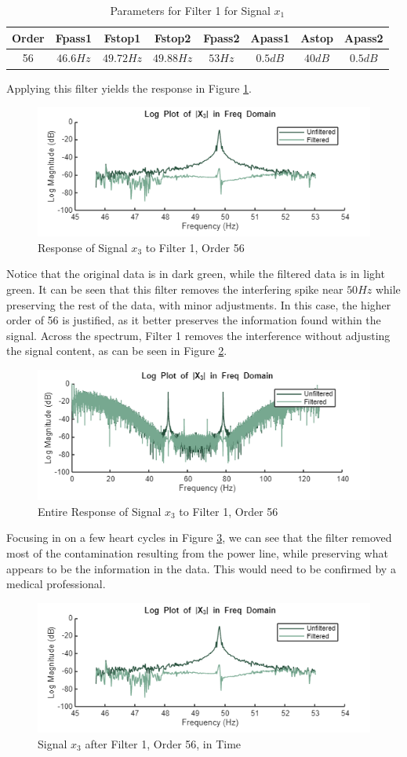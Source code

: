 \begin{table}[H]
    \centering
    \begin{tabular}{c|ccccccc}
         Order & Fpass1 & Fstop1 & Fstop2 & Fpass2 & Apass1 & Astop & Apass2 \\ \hline
         56 & $46.6 \unit{Hz}$ & $49.72  \unit{Hz}$ & $49.88  \unit{Hz}$ & $53  \unit{Hz}$ & $0.5  \unit{dB}$ & $40  \unit{dB}$ & $0.5  \unit{dB}$
    \end{tabular}
    \caption{Parameters for Filter 1 for Signal $x_1$}
    \label{tab:x3_v11}
\end{table}

Applying this filter yields the response in Figure \ref{fig:x3_v11}.
\begin{figure}[H]
    \centering
    \includegraphics[width=0.5\linewidth]{figures/X3_v11.png}
    \caption{Response of Signal $x_3$ to Filter 1, Order 56}
    \label{fig:x3_v11}
\end{figure}
Notice that the original data is in dark green, while the filtered data is in light green.  It can be seen that this filter removes the interfering spike near $50 \unit{Hz}$ while preserving the rest of the data, with minor adjustments.  In this case, the higher order of 56 is justified, as it better preserves the information found within the signal.  Across the spectrum, Filter 1 removes the interference without adjusting the signal content, as can be seen in Figure \ref{fig:X3_v11_out}.

\begin{figure}[H]
    \centering
    \includegraphics[width=0.5\linewidth]{figures/X3_v11_zoomedout.png}
    \caption{Entire Response of Signal $x_3$ to Filter 1, Order 56}
    \label{fig:X3_v11_out}
\end{figure}


Focusing in on a few heart cycles in Figure \ref{fig:x3_v11_zoom}, we can see that the filter removed most of the contamination resulting from the power line, while preserving what appears to be the information in the data.  This would need to be confirmed by a medical professional.
\begin{figure}[H]
    \centering
    \includegraphics[width=0.5\linewidth]{figures/x3_v11.png}
    \caption{Signal $x_3$ after Filter 1, Order 56, in Time}
    \label{fig:x3_v11_zoom}
\end{figure}

